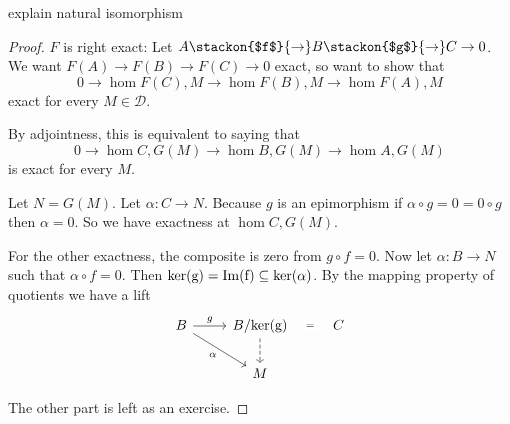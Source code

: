 \begin{remark}
    \todo explain natural isomorphism
\end{remark}
\begin{proof}
    $F$ is right exact:
    Let $A\stackon{$f$}{\to} B \stackon{$g$}{\to} C\to 0$. We want $F(A)\to F(B)\to F(C)\to 0$ exact, so want to show that \[
   0 \to \hom{F(C),M}\to \hom{F(B),M}\to \hom{F(A),M}    \]
    exact for every $M\in \mathcal{D}.$

    By adjointness, this is equivalent to saying that 
    \[
    0 \to \hom{C,G(M)}\to \hom{B,G(M)}\to \hom{A,G(M)}  \] is exact for every $M$.


    Let $N=G(M)$. Let $\alpha:C\to N$. Because $g$ is an epimorphism if $\alpha\circ g=0=0\circ g$ then $\alpha=0$. So we have exactness at $\hom{C,G(M)}$.

    For the other exactness, the composite is zero from $g\circ f=0$. Now let $\alpha:B\to N$ such that $\alpha\circ f=0$. Then $\rm{ker}(g)=\rm{Im}(f)\subseteq \rm{ker}(\alpha)$. By the mapping property of quotients we have a lift
\[\begin{tikzcd}
	B & {B/\rm{ker}(g)} & C \\
	& M
	\arrow["g", from=1-1, to=1-2]
	\arrow["\alpha"', from=1-1, to=2-2]
	\arrow["{=}"{description}, draw=none, from=1-2, to=1-3]
	\arrow[dashed,from=1-2, to=2-2]
\end{tikzcd}\]

The other part is left as an exercise.
\end{proof}
